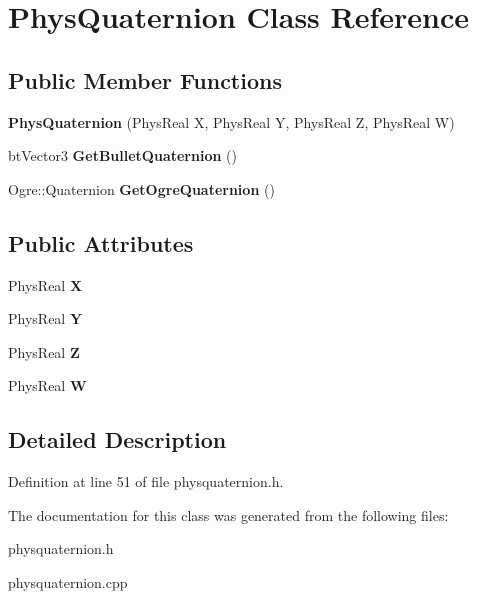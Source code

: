 \hypertarget{classPhysQuaternion}{
\section{PhysQuaternion Class Reference}
\label{d5/d19/classPhysQuaternion}
}
\subsection*{Public Member Functions}
\begin{DoxyCompactItemize}
\item 
\hypertarget{classPhysQuaternion_aa0cbd53e7a9e624a3f0f22aa94618e17}{
{\bfseries PhysQuaternion} (PhysReal X, PhysReal Y, PhysReal Z, PhysReal W)}
\label{d5/d19/classPhysQuaternion_aa0cbd53e7a9e624a3f0f22aa94618e17}

\item 
\hypertarget{classPhysQuaternion_ac19cebf7408b5e72ea3d6398d47da762}{
btVector3 {\bfseries GetBulletQuaternion} ()}
\label{d5/d19/classPhysQuaternion_ac19cebf7408b5e72ea3d6398d47da762}

\item 
\hypertarget{classPhysQuaternion_a30adc9ec3604da6ac9df49dc25b6fd31}{
Ogre::Quaternion {\bfseries GetOgreQuaternion} ()}
\label{d5/d19/classPhysQuaternion_a30adc9ec3604da6ac9df49dc25b6fd31}

\end{DoxyCompactItemize}
\subsection*{Public Attributes}
\begin{DoxyCompactItemize}
\item 
\hypertarget{classPhysQuaternion_ac6ef4975979103a0285379e166dafc9c}{
PhysReal {\bfseries X}}
\label{d5/d19/classPhysQuaternion_ac6ef4975979103a0285379e166dafc9c}

\item 
\hypertarget{classPhysQuaternion_a2b07bc54cfd68f82588cb869f8ef4428}{
PhysReal {\bfseries Y}}
\label{d5/d19/classPhysQuaternion_a2b07bc54cfd68f82588cb869f8ef4428}

\item 
\hypertarget{classPhysQuaternion_a991d092617466f15ab7c297059668cf2}{
PhysReal {\bfseries Z}}
\label{d5/d19/classPhysQuaternion_a991d092617466f15ab7c297059668cf2}

\item 
\hypertarget{classPhysQuaternion_a5569a775ccde5755ffa4a12a0a31c555}{
PhysReal {\bfseries W}}
\label{d5/d19/classPhysQuaternion_a5569a775ccde5755ffa4a12a0a31c555}

\end{DoxyCompactItemize}


\subsection{Detailed Description}


Definition at line 51 of file physquaternion.h.

The documentation for this class was generated from the following files:\begin{DoxyCompactItemize}
\item 
physquaternion.h\item 
physquaternion.cpp\end{DoxyCompactItemize}

